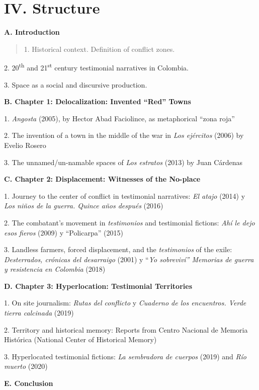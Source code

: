 \documentclass[
  11pt,
,
onecolumn,
openany
]{book}
\begin{document}
\hypertarget{iv.-structure}{%
\chapter{IV. Structure}\label{iv.-structure}}

\textbf{A. Introduction}

\begin{quote}
1. Historical context. Definition of conflict zones.
\end{quote}

2. 20\textsuperscript{th} and 21\textsuperscript{st} century testimonial
narratives in Colombia.

3. Space as a social and discursive production.

\textbf{B. Chapter 1: Delocalization: Invented ``Red'' Towns}

1. \emph{Angosta} (2005), by Hector Abad Faciolince, as metaphorical ``zona
roja''

2. The invention of a town in the middle of the war in \emph{Los ejércitos}
(2006) by Evelio Rosero

3. The unnamed/un-namable spaces of \emph{Los estratos} (2013) by Juan
Cárdenas~

\textbf{C. Chapter 2: Displacement: Witnesses of the No-place}

1. Journey to the center of conflict in testimonial narratives: \emph{El
atajo} (2014) y \emph{Los niños de la guerra. Quince años después} (2016)~

2. The combatant's movement in \emph{testimonios} and testimonial fictions:
\emph{Ahí le dejo esos fieros} (2009) y ``Policarpa'' (2015)

3. Landless farmers, forced displacement, and the \emph{testimonios} of the
exile: \emph{Desterrados, crónicas del desarraigo} (2001) y ``\emph{Yo
sobreviví'' Memorias de guerra y resistencia en Colombia} (2018)~

\textbf{D. Chapter 3: Hyperlocation: Testimonial Territories}

1. On site journalism: \emph{Rutas del conflicto} y \emph{Cuaderno de los
encuentros. Verde tierra calcinada} (2019)\emph{~}

2. Territory and historical memory: Reports from Centro Nacional de Memoria
Histórica (National Center of Historical Memory)

3. Hyperlocated testimonial fictions: \emph{La sembradora de cuerpos} (2019)
and \emph{Río muerto} (2020)

\textbf{E. Conclusion}
\end{document}
